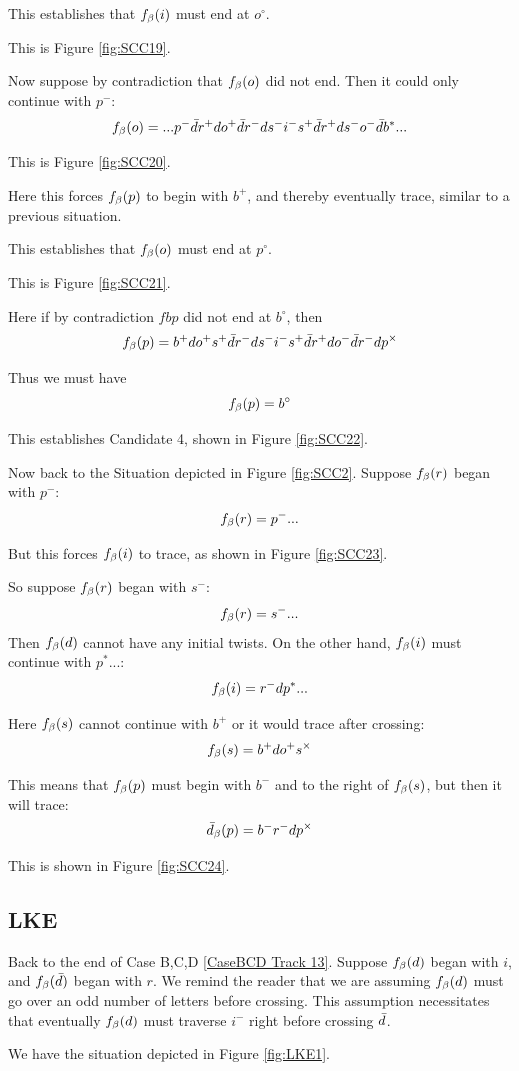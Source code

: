 This establishes that $f_\beta(i)$ must end at $o^\circ$.

This is Figure \ref{fig:SCC19}.

Now suppose by contradiction that $f_\beta(o)$ did not end. Then it could only continue with $p^-$:
\[
f_\beta(o) = ...p^- \bar{d} r^+ d o^+ \bar{d} r^- d s^- i^- s^+ \bar{d} r^+ d s^- o^- \bar{d} b^*...
\]

This is Figure \ref{fig:SCC20}.

Here this forces $f_\beta(p)$ to begin with $b^+$, and thereby eventually trace, similar to a previous situation.

This establishes that $f_\beta(o)$ must end at $p^\circ$. 

This is Figure \ref{fig:SCC21}.

Here if by contradiction $fbp$ did not end at $b^\circ$, then
\[
f_\beta(p) = b^+ d o^+ s^+ \bar{d} r^- d s^- i^- s^+ \bar{d} r^+ d o^- \bar{d} r^- d p^\times
\]

Thus we must have
\[
f_\beta(p) = b^\circ
\]

This establishes Candidate 4, shown in Figure \ref{fig:SCC22}.

Now back to the Situation depicted in Figure \ref{fig:SCC2}. Suppose $f_\beta(r)$ began with $p^-$:
\[
f_\beta(r) = p^-...
\]

But this forces $f_\beta(i)$ to trace, as shown in Figure \ref{fig:SCC23}.

So suppose $f_\beta(r)$ began with $s^-$:
\[
f_\beta(r) = s^-...
\]
Then $f_\beta(d)$ cannot have any initial twists. On the other hand, $f_\beta(i)$ must continue with $p^*...$:
\[
f_\beta(i) = r^- d p^*...
\]

Here $f_\beta(s)$ cannot continue with $b^+$ or it would trace after crossing:
\[
f_\beta(s) = b^+ d o^+ s^\times
\]

This means that $f_\beta(p)$ must begin with $b^-$ and to the right of $f_\beta(s)$, but then it will trace:
\[
\bar{d}_\beta(p) = b^- r^- d p^\times
\]

This is shown in Figure \ref{fig:SCC24}.

\subsection{LKE}\label{LKE}
Back to the end of Case B,C,D \ref{CaseBCD Track 13}.
Suppose $f_\beta(d)$ began with $i$, and $f_\beta(\bar{d})$ began with $r$. We remind the reader that we are assuming $f_\beta(d)$ must go over an odd number of letters before crossing. This assumption necessitates that eventually $f_\beta(d)$ must traverse $i^-$ right before crossing $\bar{d}$.

We have the situation depicted in Figure \ref{fig:LKE1}.

